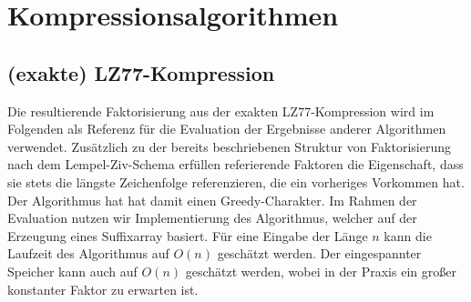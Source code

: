 \chapter{Kompressionsalgorithmen}

\section{(exakte) LZ77-Kompression}
Die resultierende Faktorisierung aus der exakten LZ77-Kompression wird im Folgenden als Referenz für die Evaluation der Ergebnisse anderer Algorithmen verwendet.
Zusätzlich zu der bereits beschriebenen Struktur von Faktorisierung nach dem Lempel-Ziv-Schema erfüllen referierende Faktoren die Eigenschaft, dass sie stets
die längste Zeichenfolge referenzieren, die ein vorheriges Vorkommen hat. Der Algorithmus hat hat damit einen Greedy-Charakter. Im Rahmen der Evaluation nutzen 
wir Implementierung des Algorithmus, welcher auf der Erzeugung eines Suffixarray basiert. Für eine Eingabe der Länge $n$ kann die Laufzeit des Algorithmus auf
$O(n)$ geschätzt werden. Der eingespannter Speicher kann auch auf $O(n)$ geschätzt werden, wobei in der Praxis ein großer konstanter Faktor zu erwarten ist.